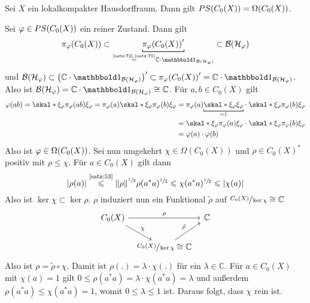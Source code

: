 \begin{satz}[{name=[{Reine Zustände von $C_0(X)$}]}]
	Sei $X$ ein lokalkompakter Hausdorffraum.
	Dann gilt $PS\enbrace*{C_0(X)}=\Omega \enbrace*{C_0(X)}$.
\end{satz}
\begin{beweis}
	Sei $\varphi \in PS \enbrace*{C_0(X)}$ ein reiner Zustand.
	Dann gilt
	\[
		\pi_\varphi \enbrace*{C_0(X)} \subset \Underbracket{\pi_\varphi \enbrace*{C_0(X)}'}{\stackrel{\mbox{\tiny\ref{satz:73},\ref{satz:75}}}{=} \mathbb{C} \cdot \ind_{\mathcal{B}(\mathcal{H}_\varphi)}} \subset \mathcal{B}(\mathcal{H}_\varphi)
	\]
	und $\mathcal{B}(\mathcal{H}_\varphi) \subset \enbrace*{\mathbb{C}\cdot \ind_{\mathcal{B}(\mathcal{H}_\varphi)}}' \subset \pi_\varphi \enbrace*{C_0(X)}'=\mathbb{C}\cdot \ind_{\mathcal{B}(\mathcal{H_\varphi})}$.
	Also ist $\mathcal{B}(\mathcal{H}_\varphi)= \mathbb{C} \cdot \ind_{\mathcal{B}(\mathcal{H_\varphi})} \cong \mathbb{C}$.
	Für $a,b \in C_0(X)$ gilt 
	\begin{align}
		\varphi(ab) = \skal*{\xi_\varphi}{\pi_\varphi(ab)\xi_\varphi} = \pi_\varphi(a) \skal*{\xi_\varphi}{\pi_\varphi(b) \xi_\varphi} 
		&= \pi_\varphi(a) \Underbracket{\skal*{\xi_\varphi}{\xi_\varphi}}{=1} \cdot \skal*{\xi_\varphi}{\pi_\varphi(b)\xi_\varphi} \\
		&= \skal*{\xi_\varphi}{\pi_\varphi(a)\xi_\varphi} \cdot \skal*{\xi_\varphi}{\pi_\varphi(b)\xi_\varphi} \\
		&= \varphi(a) \cdot \varphi(b)
	\end{align}
	Also ist $\varphi \in \Omega \enbrace*{C_0(X)}$. 
	Sei nun umgekehrt $\chi \in \Omega(C_0(X))$ und $\rho \in C_0(X)^*$ positiv mit $\rho \le \chi$.
	Für $a \in C_0(X)$ gilt dann
	\[
		\abs*{\rho(a)} \StackText{\ref{satz:53}}{\le} \norm*{\rho}^{\sfrac{1}{2}} \rho(a^*a)^{\sfrac{1}{2}} \le \chi(a^* a)^{\sfrac{1}{2}} \le \abs*{\chi(a)} 
	\]
	Also ist $\ker \chi \subset \ker \rho$.
	$\rho$ induziert nun ein Funktional $\tilde{\rho}$ auf $\sfrac{C_0(X)}{\ker \chi} \cong \mathbb{C}$
	\[
		\begin{tikzcd}[column sep=.6em]
			C_0(X) \ar[rr,"\rho"] \drar["\chi"]& & \mathbb{C} \\
			& \sfrac{C_0(X)}{\ker \chi} \cong \mathbb{C} \urar["\tilde{\rho}"]
		\end{tikzcd}
	\]
	Also ist $\rho = \tilde{\rho} \circ \chi$.
	Damit ist $\rho(. ) = \lambda \cdot \chi(.)$ für ein $\lambda \in \mathbb{C}$.
	Für $a \in C_0(X)$ mit $\chi(a)=1$ gilt $0\le\rho(a^*a)= \lambda \cdot \chi(a^*a)=\lambda$ und außerdem $\rho(a^*a) \le \chi(a^*a)=1$, womit $0 \le \lambda\le 1$ ist.
	Daraus folgt, dass $\chi$ rein ist.
\end{beweis}

